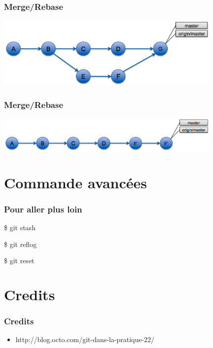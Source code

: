 \documentclass{beamer}
\begin{document}
\begin{frame}
\frametitle{Merge/Rebase}
    \begin{center}
     \includegraphics[width=11cm]{imgs/git-merge2.png}
     \end{center}
\end{frame}

\begin{frame}
\frametitle{Merge/Rebase}
    \begin{center}
     \includegraphics[width=11cm]{imgs/git-rebase.png}
     \end{center}
\end{frame}


\section{Commande avancées}
\begin{frame}
  \frametitle{Pour aller plus loin}
  \begin{semiverbatim}
    \$ git stash

    \$ git reflog

    \$ git reset
  \end{semiverbatim}
\end{frame}

\section{Credits}
\begin{frame}
  \frametitle{Credits}
  \begin{itemize}
  \item http://blog.octo.com/git-dans-la-pratique-22/
  \end{itemize}
  
\end{frame}
\end{document}
